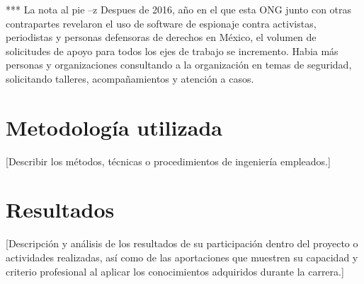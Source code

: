 \documentclass[12pt]{caltech_thesis}
\begin{document}
*** La nota al pie --z Despues de 2016, año en el que esta ONG junto con otras contrapartes revelaron el uso de software de espionaje contra activistas, periodistas y personas defensoras de derechos en México, el volumen de solicitudes de apoyo para todos los ejes de trabajo se incremento. Habia más personas y organizaciones consultando a la organización en temas de seguridad, solicitando talleres, acompañamientos y atención a casos.




\chapter{Metodología utilizada}

[Describir los métodos, técnicas o procedimientos de ingeniería empleados.]


\chapter{Resultados}

[Descripción y análisis de los resultados de su participación dentro del proyecto o actividades realizadas, así como de las aportaciones que muestren su capacidad y criterio profesional al aplicar los conocimientos adquiridos durante la carrera.]

\end{document}
